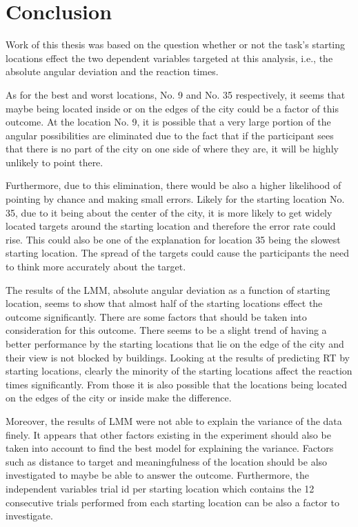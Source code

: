 \chapter{Conclusion}

Work of this thesis was based on the question whether or not the task's starting locations effect the two dependent variables targeted at this analysis, i.e., the absolute angular deviation and the reaction times.

As for the best and worst locations, No. 9 and No. 35 respectively, it seems that maybe being located inside or on the edges of the city could be a factor of this outcome. At the location No. 9, it is possible that a very large portion of the angular possibilities are eliminated due to the fact that if the participant sees that there is no part of the city on one side of where they are, it will be highly unlikely to point there.

 Furthermore, due to this elimination, there would be also a higher likelihood of pointing by chance and making small errors. Likely for the starting location No. 35, due to it being about the center of the city, it is more likely to get widely located targets around the starting location and therefore the error rate could rise. This could also be one of the explanation for location 35 being the slowest starting location. The spread of the targets could cause the participants the need to think more accurately about the target. 

The results of the LMM, absolute angular deviation as a function of starting location, seems to show that almost half of the starting locations effect the outcome significantly. There are some factors that should be taken into consideration for this outcome. There seems to be a slight trend of having a better performance by the starting locations that lie on the edge of the city and their view is not blocked by buildings.
Looking at the results of predicting RT by starting locations, clearly the minority of the starting locations affect the reaction times significantly. From those it is also possible that the locations being located on the edges of the city or inside make the difference. 

Moreover, the results of LMM were not able to explain the variance of the data finely. It appears that other factors existing in the experiment should also be taken into account to find the best model for explaining the variance. Factors such as distance to target and meaningfulness of the location should be also investigated to maybe be able to answer the outcome. Furthermore, the independent variables trial id per starting location which contains the 12 consecutive trials performed from each starting location can be also a factor to investigate.\\


